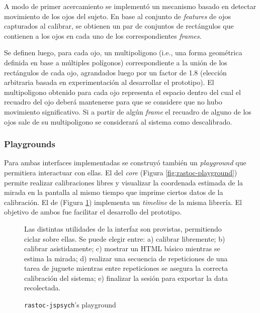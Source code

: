 A modo de primer acercamiento se implementó un mecanismo basado en detectar
movimiento de los ojos del sujeto.
En base al conjunto de \textit{features} de ojos capturados al calibrar, se
obtienen un par de conjuntos de rectángulos que contienen a los ojos en cada
uno de los correspondientes \textit{frames}.

Se definen luego, para cada ojo, un multipoligono (i.e., una forma geométrica
definida en base a múltiples polígonos) correspondiente a la unión de los
rectángulos de cada ojo, agrandados luego por un factor de 1.8 (elección
arbitraria basada en experimentación al desarrollar el prototipo).
El multipoligono obtenido para cada ojo representa el espacio dentro del cual
el recuadro del ojo deberá mantenerse para que se considere que no hubo
movimiento significativo.
Si a partir de algún \textit{frame} el recuadro de alguno de los ojos sale de
su multipoligono se considerará al sistema como descalibrado.

\subsubsection{Playgrounds}

Para ambas interfaces implementadas se construyó también un \textit{playground}
que permitiera interactuar con ellas.
El del \textit{core} (Figura \ref{fig:rastoc-playground}) permite realizar
calibraciones libres y visualizar la coordenada estimada de la mirada en la
pantalla al mismo tiempo que imprime ciertos datos de la calibración.
El de \jspsych (Figura \ref{fig:rastoc-jspsych-playground}) implementa un
\textit{timeline} de la misma librería.
El objetivo de ambos fue facilitar el desarrollo del prototipo.

\begin{figure}
    \centering
    \caption{\texttt{rastoc-jspsych}’s playground}
    Las distintas utilidades de la interfaz \jspsych son provistas, permitiendo
    ciclar sobre ellas.
    Se puede elegir entre:
    a) calibrar libremente;
    b) calibrar asistidamente;
    c) mostrar un HTML básico mientras se estima la mirada;
    d) realizar una secuencia de repeticiones de una tarea de juguete mientras
    entre repeticiones se asegura la correcta calibración del sistema;
    e) finalizar la sesión para exportar la data recolectada.
    \label{fig:rastoc-jspsych-playground}
\end{figure}

